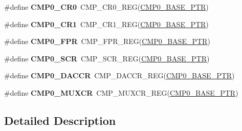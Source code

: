 \begin{DoxyCompactItemize}
\mbox{\label{group___c_m_p___register___accessor___macros_ga0b4ea995265b027fb308b236b2f0afd4}} 
\#define {\bfseries C\+M\+P0\+\_\+\+C\+R0}~C\+M\+P\+\_\+\+C\+R0\+\_\+\+R\+EG(\hyperlink{group___c_m_p___peripheral_ga5a7a6b1d0743a05435ba5cb2dc2b3431}{C\+M\+P0\+\_\+\+B\+A\+S\+E\+\_\+\+P\+TR})
\item 
\mbox{\label{group___c_m_p___register___accessor___macros_ga993cebfc8cb6bcf6caec49cd75218d17}} 
\#define {\bfseries C\+M\+P0\+\_\+\+C\+R1}~C\+M\+P\+\_\+\+C\+R1\+\_\+\+R\+EG(\hyperlink{group___c_m_p___peripheral_ga5a7a6b1d0743a05435ba5cb2dc2b3431}{C\+M\+P0\+\_\+\+B\+A\+S\+E\+\_\+\+P\+TR})
\item 
\mbox{\label{group___c_m_p___register___accessor___macros_gafc67824f9a3bc92eaf359c91bf1df5b6}} 
\#define {\bfseries C\+M\+P0\+\_\+\+F\+PR}~C\+M\+P\+\_\+\+F\+P\+R\+\_\+\+R\+EG(\hyperlink{group___c_m_p___peripheral_ga5a7a6b1d0743a05435ba5cb2dc2b3431}{C\+M\+P0\+\_\+\+B\+A\+S\+E\+\_\+\+P\+TR})
\item 
\mbox{\label{group___c_m_p___register___accessor___macros_ga4b5f2afaed69d7a475c7b49e6072c2d1}} 
\#define {\bfseries C\+M\+P0\+\_\+\+S\+CR}~C\+M\+P\+\_\+\+S\+C\+R\+\_\+\+R\+EG(\hyperlink{group___c_m_p___peripheral_ga5a7a6b1d0743a05435ba5cb2dc2b3431}{C\+M\+P0\+\_\+\+B\+A\+S\+E\+\_\+\+P\+TR})
\item 
\mbox{\label{group___c_m_p___register___accessor___macros_ga35e0e1f16fe611949cc7970ad0119891}} 
\#define {\bfseries C\+M\+P0\+\_\+\+D\+A\+C\+CR}~C\+M\+P\+\_\+\+D\+A\+C\+C\+R\+\_\+\+R\+EG(\hyperlink{group___c_m_p___peripheral_ga5a7a6b1d0743a05435ba5cb2dc2b3431}{C\+M\+P0\+\_\+\+B\+A\+S\+E\+\_\+\+P\+TR})
\item 
\mbox{\label{group___c_m_p___register___accessor___macros_ga5ee1e22a7f08ec3cdad0083a790b10b3}} 
\#define {\bfseries C\+M\+P0\+\_\+\+M\+U\+X\+CR}~C\+M\+P\+\_\+\+M\+U\+X\+C\+R\+\_\+\+R\+EG(\hyperlink{group___c_m_p___peripheral_ga5a7a6b1d0743a05435ba5cb2dc2b3431}{C\+M\+P0\+\_\+\+B\+A\+S\+E\+\_\+\+P\+TR})
\end{DoxyCompactItemize}


\subsection{Detailed Description}
